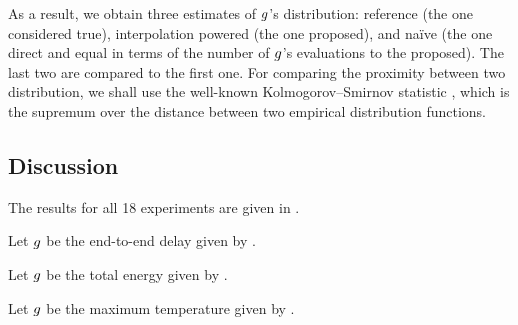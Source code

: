 As a result, we obtain three estimates of $g$'s distribution: reference (the
one considered true), interpolation powered (the one proposed), and na\"{i}ve
(the one direct and equal in terms of the number of $g$'s evaluations to the
proposed). The last two are compared to the first one. For comparing the
proximity between two distribution, we shall use the well-known
Kolmogorov--Smirnov statistic \cite{rao2009}, which is the supremum over the
distance between two empirical distribution functions.


\subsection{Discussion}
The results for all 18 experiments are given in .

Let $g$ be the end-to-end delay given by .

Let $g$ be the total energy given by .

Let $g$ be the maximum temperature given by .
